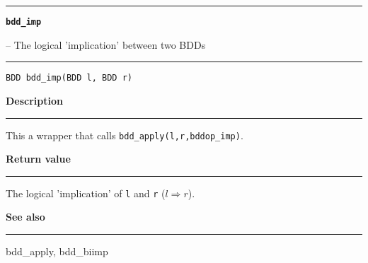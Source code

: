 \begin{minipage}{\textwidth}

\noindent\begin{minipage}{\textwidth}
\rule{\textwidth}{0.5mm}
{\tt\bf bdd\_imp }
\--- The logical 'implication' between two BDDs  \hspace{\fill}
\\\rule[1.5ex]{\textwidth}{0.5mm}
\end{minipage}

\noindent\begin{verbatim}
BDD bdd_imp(BDD l, BDD r) 
\end{verbatim}

\vspace{\parsep}\noindent
{\bf Description}\\\rule[1.5ex]{\textwidth}{0.2mm}\vspace{-1.5ex}\setlength{\parindent}{1em}
This a wrapper that calls {\tt bdd\_apply(l,r,bddop\_imp)}. 

\setlength{\parindent}{0em}\vspace{\parsep}\vspace{\baselineskip}\noindent
{\bf Return value}\\\rule[1.5ex]{\textwidth}{0.2mm}\vspace{-1.5ex}
The logical 'implication' of {\tt l} and {\tt r} ($l \Rightarrow r$). 

\vspace{\parsep}\vspace{\baselineskip}\noindent
{\bf See also}\\\rule[1.5ex]{\textwidth}{0.2mm}\vspace{-1.5ex}
bdd\_apply, bdd\_biimp 
\end{minipage}
\vspace{8ex}
